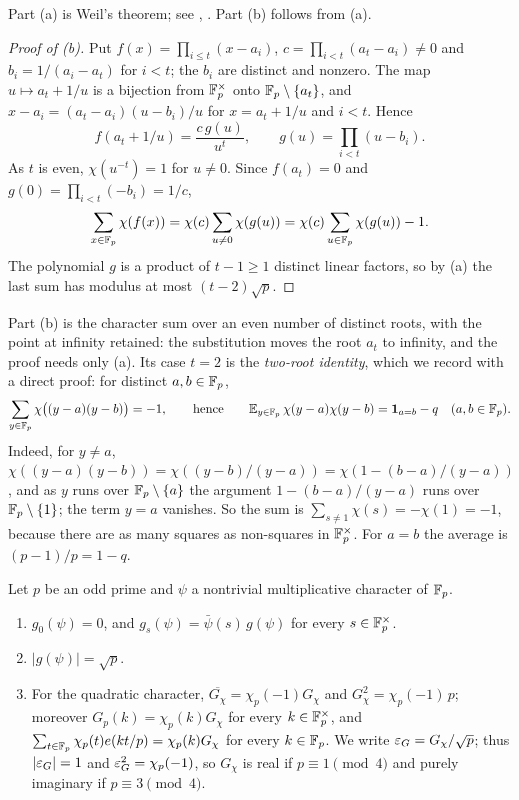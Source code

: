 Part (a) is Weil's theorem; see \cite[Theorem~11.23]{IwaniecKowalski},
\cite[Ch.~II]{Schmidt76}. Part (b) follows from (a).

\begin{proof}[Proof of \textup{(b)}]
Put $f(x)=\prod_{i\le t}(x-a_i)$, $c=\prod_{i<t}(a_t-a_i)\ne0$ and
$b_i=1/(a_i-a_t)$ for $i<t$; the $b_i$ are distinct and nonzero. The map
$u\mapsto a_t+1/u$ is a bijection from $\mathbb F_p^\times$ onto $\mathbb F_p\setminus\{a_t\}$,
and $x-a_i=(a_t-a_i)(u-b_i)/u$ for $x=a_t+1/u$ and $i<t$. Hence
\[
 f(a_t+1/u)=\frac{c\,g(u)}{u^t},\qquad g(u)=\prod_{i<t}(u-b_i).
\]
As $t$ is even, $\chi(u^{-t})=1$ for $u\ne0$. Since $f(a_t)=0$ and
$g(0)=\prod_{i<t}(-b_i)=1/c$,
\[
 \sum_{x\in\mathbb F_p}\chi(f(x))=\chi(c)\sum_{u\ne0}\chi(g(u))
 =\chi(c)\sum_{u\in\mathbb F_p}\chi(g(u))-1 .
\]
The polynomial $g$ is a product of $t-1\ge1$ distinct linear factors, so by
(a) the last sum has modulus at most $(t-2)\sqrt p$.
\end{proof}

Part (b) is the character sum over an even number of distinct roots, with the point at infinity retained: the
substitution moves the root $a_t$ to infinity, and the proof needs only (a).
Its case $t=2$ is the \emph{two-root identity}, which we record with a direct
proof: for distinct $a,b\in\mathbb F_p$,
\begin{equation}\label{eq:two-root}
 \sum_{y\in\mathbb F_p}\chi\bigl((y-a)(y-b)\bigr)=-1,\qquad\text{hence}\qquad
 \mathbb E_{y\in\mathbb F_p}\,\chi(y-a)\chi(y-b)=\mathbf 1_{a=b}-q\quad(a,b\in\mathbb F_p).
\end{equation}
Indeed, for $y\ne a$, $\chi((y-a)(y-b))=\chi((y-b)/(y-a))=\chi(1-(b-a)/(y-a))$,
and as $y$ runs over $\mathbb F_p\setminus\{a\}$ the argument $1-(b-a)/(y-a)$ runs
over $\mathbb F_p\setminus\{1\}$; the term $y=a$ vanishes. So the sum is
$\sum_{s\ne1}\chi(s)=-\chi(1)=-1$, because there are as many squares as
non-squares in $\mathbb F_p^\times$. For $a=b$ the average is $(p-1)/p=1-q$.

\begin{theorem}\label{thm:gauss}
Let $p$ be an odd prime and $\psi$ a nontrivial multiplicative character of $\mathbb F_p$.
\begin{enumerate}[label=\textup{(\roman*)}]
\item\label{it:gauss:twist} $g_0(\psi)=0$, and $g_s(\psi)=\bar\psi(s)\,g(\psi)$
  for every $s\in\mathbb F_p^\times$.
\item\label{it:gauss:abs} $|g(\psi)|=\sqrt p$.
\item\label{it:gauss:quad} For the quadratic character,
  $\overline{G_\chi}=\chi_p(-1)G_\chi$ and $G_\chi^2=\chi_p(-1)\,p$; moreover
  $G_p(k)=\chi_p(k)G_\chi$ for every $k\in\mathbb F_p^\times$, and
  $\sum_{t\in\mathbb F_p}\chi_p(t)e\!\left(kt/p\right)=\chi_p(k)G_\chi$ for every $k\in\mathbb F_p$. We
  write $\varepsilon_G=G_\chi/\sqrt p$; thus $|\varepsilon_G|=1$ and $\varepsilon_G^2=\chi_p(-1)$, so
  $G_\chi$ is real if $p\equiv1\pmod4$ and purely imaginary if $p\equiv3\pmod4$.
\end{enumerate}
\end{theorem}

